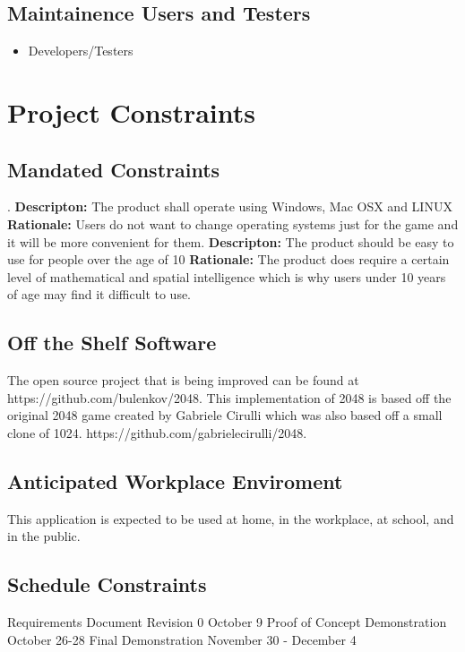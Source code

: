 \documentclass[12pt]{article}
\begin{document}
\subsection{Maintainence Users and Testers}
\begin{itemize}
\item Developers/Testers
\end{itemize}

\section{Project Constraints}
\subsection{Mandated Constraints}.\newline
\textbf{Descripton:} The product shall operate using Windows, Mac OSX and LINUX
\textbf{Rationale:} Users do not want to change operating systems just for the game and it will be more convenient for them. 
\newline
\newline
\textbf{Descripton:} The product should be easy to use for people over the age of 10
\textbf{Rationale:} The product does require a certain level of mathematical and spatial intelligence which is why users under 10 years of age may find it difficult to use. 

\subsection{Off the Shelf Software}
The open source project that is being improved can be found at https://github.com/bulenkov/2048.
This implementation of 2048 is based off the original 2048 game created by Gabriele Cirulli which was also based off a small clone of 1024. https://github.com/gabrielecirulli/2048.\newline

\subsection{Anticipated Workplace Enviroment}
This application is expected to be used at home, in the workplace, at school, and in the public.\newline

\subsection{Schedule Constraints}
Requirements Document Revision 0	\hfill	October 9 \newline
Proof of Concept Demonstration \hfill		October 26-28 \newline
Final Demonstration \hfill				November 30 - December 4 \newline
\end{document}
